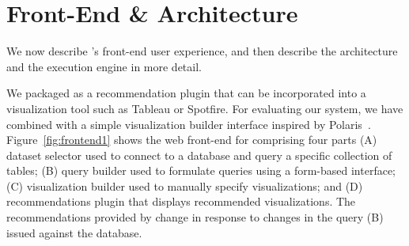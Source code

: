 
\section{{\large \SeeDB} Front-End \& Architecture}
\label{sec:system_architecture}


We now describe \SeeDB's front-end user experience, and then
describe the architecture and the execution engine in more detail.

We packaged \SeeDB as a recommendation plugin that can
be incorporated into a visualization tool such as Tableau or Spotfire. 
For evaluating our system, we have combined \SeeDB with a simple visualization
builder interface inspired by Polaris~\cite{polaris}.
Figure~\ref{fig:frontend1} shows the web front-end for \SeeDB 
comprising four parts 
(A) dataset selector used to connect to a database and query a specific collection of tables; 
(B) query builder used to
formulate queries using a form-based interface; 
(C) visualization builder used to manually specify visualizations; and 
(D) \SeeDB recommendations plugin 
that displays recommended visualizations.
The recommendations provided by \SeeDB change in 
response to changes in the query (B)
issued against the database.


